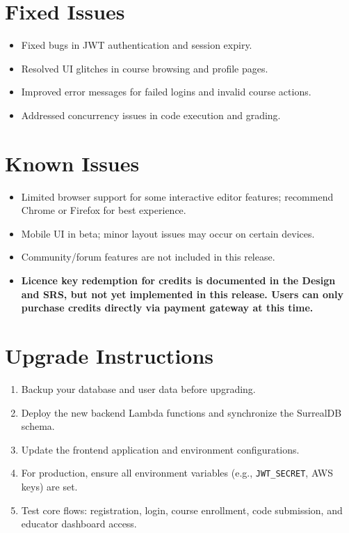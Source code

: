 \documentclass[a4paper,11pt]{scrartcl}
\begin{document}
\section{Fixed Issues}

\begin{itemize}[leftmargin=*]
    \item Fixed bugs in JWT authentication and session expiry.
    \item Resolved UI glitches in course browsing and profile pages.
    \item Improved error messages for failed logins and invalid course actions.
    \item Addressed concurrency issues in code execution and grading.
\end{itemize}

\section{Known Issues}

\begin{itemize}[leftmargin=*]
    \item Limited browser support for some interactive editor features; recommend Chrome or Firefox for best experience.
    \item Mobile UI in beta; minor layout issues may occur on certain devices.
    \item Community/forum features are not included in this release.
    \item \textbf{Licence key redemption for credits is documented in the Design and SRS, but not yet implemented in this release. Users can only purchase credits directly via payment gateway at this time.}
\end{itemize}

\section{Upgrade Instructions}

\begin{enumerate}[leftmargin=*]
    \item Backup your database and user data before upgrading.
    \item Deploy the new backend Lambda functions and synchronize the SurrealDB schema.
    \item Update the frontend application and environment configurations.
    \item For production, ensure all environment variables (e.g., \texttt{JWT\_SECRET}, AWS keys) are set.
    \item Test core flows: registration, login, course enrollment, code submission, and educator dashboard access.
\end{enumerate}
\end{document}
